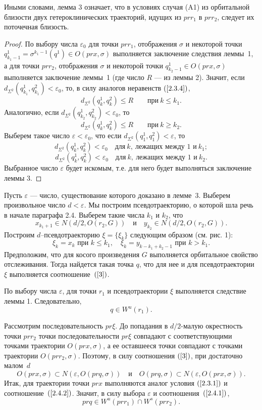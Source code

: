 \documentclass[12pt]{article}
\begin{document}
Иными словами, лемма 3 означает, что в условиях случая (A1) из орбитальной близости двух гетероклинических траекторий, идущих из $pr r_1$ в $pr r_2$, следует их поточечная близость. 

\begin{proof} По выбору числа $\varepsilon_0$ для точки $pr r_1$, отображения $\sigma$ и некоторой точки $q^1_{k_1-1}=\sigma^{k_1-1}(q^1)\in O(pr x,\sigma)$ выполняется заключение следствия леммы~1, а для точки $pr r_2$, отображения $\sigma$ и некоторой точки $q^1_{k_2-1}\in O(pr x,\sigma)$ выполняется заключение леммы~1 (где число $R$ ---  из леммы 2). 
Значит, если $d_{\Sigma^2}(q^1_{k_1},q^2_{k_1})<\varepsilon_0$, то, в силу аналогов неравенств $(\ref{2.3.4})$,
$$d_{\Sigma^2}(q^1_{k},q^2_{k})\leq R\qquad\textrm{при}\ k\leq k_1.$$
Аналогично, если $d_{\Sigma^2}(q^1_{k_2}, q^2_{k_2})<\varepsilon_0$, то 
$$d_{\Sigma^2}(q^1_{k},q^2_{k})\leq R\qquad\textrm{при}\ k\geq k_2.$$
Выберем такое число $\varepsilon<\varepsilon_0$, что если $d_{\Sigma^2}(q_1^1,q_1^2)<\varepsilon$, то
$$d_{\Sigma^2}(q^1_k,q^2_k)<\varepsilon_0\quad\textrm{для}\ k,\ \textrm{лежащих между 1 и}\ k_1;$$
$$d_{\Sigma^2}(q^1_k,q^2_k)<\varepsilon_0\quad\textrm{для}\ k,\ \textrm{лежащих между 1 и}\ k_2.$$
Выбранное число $\varepsilon$ будет искомым, т.е. для него будет выполняться заключение леммы 3.
\end{proof}

Пусть $\varepsilon$ --- число, существование которого доказано в лемме~3. 
Выберем произвольное число $d<\varepsilon$. Мы построим псевдотраекторию, о которой шла речь в начале параграфа 2.4.
Выберем такие числа $k_1$ и $k_2$, что
$$x_{k_1+1}\in N(d/2,O(r_2,G))\quad\textrm{и}\quad y_{k_2}\in N(d/2,O(r_2,G)).$$
Построим $d$--псевдотраекто\-рию $\xi=\{\xi_k\}$ следующим образом (см. рис. 1):
$$\xi_k=x_k\textrm{ при }k\leq k_1,\quad\xi_k=y_{k-k_1+k_2-1}\textrm{ при }k>k_1.$$ 
Предположим, что для косого произведения $G$ выполняется орбитальное свойство отслеживания. Тогда найдется такая точка $q$, что для нее и для псевдотраектории $\xi$ выполняется соотношение~$(\ref{3})$.

По выбору числа $\varepsilon$, для точки $r_1$ и псевдотраектории $\xi$ выполняется следствие леммы 1. Следовательно, 
\begin{equation}
\label{2.4.1}
q\in W^u(r_1).
\end{equation}

Рассмотрим последовательность $pr \xi$. До попадания в $d/2$-малую окрестность точки $pr r_2$ точки последовательности $pr\xi$ совпадают с соответствующими точками траектории $O(pr x,\sigma)$, а ее оставшееся точки совпадают с точками траектории $O(pr r_2,\sigma)$. Поэтому, в силу соотношения $(\ref{3})$, при достаточно малом~$d$
\begin{equation}
\label{2.4.2}
O(pr x,\sigma)\subset N(\varepsilon, O(pr q,\sigma))\quad\textrm{и}\quad O(pr q,\sigma)\subset N(\varepsilon, O(pr x,\sigma)).
\end{equation}
Итак, для траектории точки $pr x$ выполняются аналог условия $(\ref{2.3.1})$ и соотношение~$(\ref{2.4.2})$. Значит, в силу выбора $\varepsilon$ и соотношения~$(\ref{2.4.1})$,
$$pr q\in W^u(pr r_1)\cap W^s(pr r_2).$$
\end{document}
